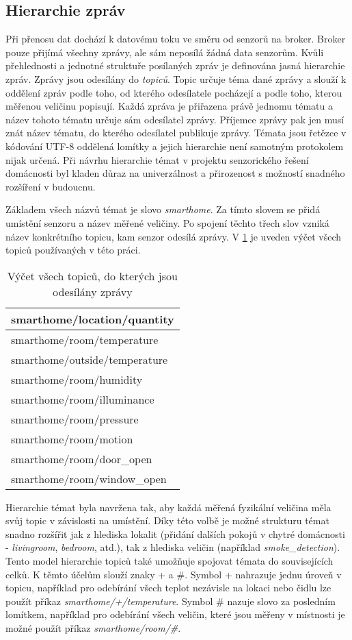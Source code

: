 \subsection{Hierarchie zpráv} \label{subsec:message_hierarchy}
Při přenosu dat dochází k datovému toku ve směru od senzorů na broker. Broker pouze přijímá všechny zprávy, ale sám neposílá žádná data senzorům. Kvůli přehlednosti a jednotné struktuře posílaných zpráv je definována jasná hierarchie zpráv. Zprávy jsou odesílány do \textit{topiců}. Topic určuje téma dané zprávy a slouží k oddělení zpráv podle toho, od kterého odesílatele pocházejí a podle toho, kterou měřenou veličinu popisují. Každá zpráva je přiřazena právě jednomu tématu a název tohoto tématu určuje sám odesílatel zprávy. Příjemce zprávy pak jen musí znát název tématu, do kterého odesílatel publikuje zprávy. Témata jsou řetězce v kódování UTF-8 oddělená lomítky a jejich hierarchie není samotným protokolem nijak určená. Při návrhu hierarchie témat v projektu senzorického řešení domácnosti byl kladen důraz na univerzálnost a přirozenost s možností snadného rozšíření v budoucnu. \par
Základem všech názvů témat je slovo \textit{smarthome}. Za tímto slovem se přidá umístění senzoru a název měřené veličiny. Po spojení těchto třech slov vzniká název konkrétního topicu, kam senzor odesílá zprávy. V \cref{tab:mqtt_topic_structure} je uveden výčet všech topiců používaných v této práci.

\begin{table}[h]
\centering
 \begin{tabular}{|p{5.5cm}|} 
 \hline
  smarthome/location/quantity  \\
 \hline\hline
 smarthome/room/temperature \\ 
 smarthome/outside/temperature \\
 smarthome/room/humidity \\
 smarthome/room/illuminance \\
 smarthome/room/pressure \\
 smarthome/room/motion \\
 smarthome/room/door\_open \\
 smarthome/room/window\_open \\
 \hline
 \end{tabular}
 \caption{Výčet všech topiců, do kterých jsou odesílány zprávy}
 \label{tab:mqtt_topic_structure}
\end{table}

Hierarchie témat byla navržena tak, aby každá měřená fyzikální veličina měla svůj topic v závislosti na umístění. Díky této volbě je možné strukturu témat snadno rozšířit jak z hlediska lokalit (přidání dalších pokojů v chytré domácnosti - \textit{livingroom}, \textit{bedroom}, atd.), tak z hlediska veličin (například \textit{smoke\_detection}). Tento model hierarchie topiců také umožňuje spojovat témata do souvisejících celků. K těmto účelům slouží znaky + a \#. Symbol + nahrazuje jednu úroveň v topicu, například pro odebírání všech teplot nezávisle na lokaci nebo čidlu lze použít příkaz \textit{smarthome/+/temperature}. Symbol  \# nazuje slovo za posledním lomítkem, například pro odebírání všech veličin, které jsou měřeny v místnosti je možné použít příkaz \textit{smarthome/room/\#}. 

